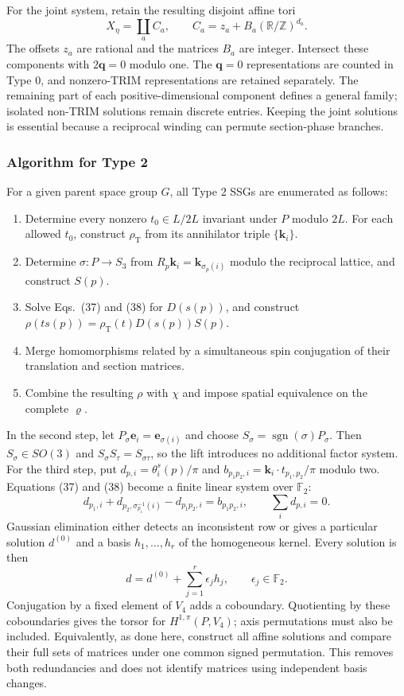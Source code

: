 \documentclass{article}
\begin{document}
For the joint system, retain the resulting disjoint affine tori
\[
 X_\eta=\coprod_a C_a,\qquad
 C_a=z_a+B_a(\mathbb R/\mathbb Z)^{d_a}.
\]
The offsets $z_a$ are rational and the matrices $B_a$ are integer.
Intersect these components with $2\bm q=0$ modulo one. The
$\bm q=0$ representations are counted in Type 0, and nonzero-TRIM
representations are retained separately. The remaining part of each
positive-dimensional component defines a general family; isolated
non-TRIM solutions remain discrete entries. Keeping the joint
solutions is essential because a reciprocal winding can permute
section-phase branches.

\subsubsection{Algorithm for Type 2}

For a given parent space group $G$, all Type 2 SSGs are enumerated
as follows:
\begin{enumerate}
\renewcommand{\labelenumi}{(\roman{enumi})}
\item Determine every nonzero $t_0\in L/2L$ invariant under $P$
modulo $2L$. For each allowed $t_0$, construct $\rho_{\mathrm T}$
from its annihilator triple $\{\bm k_i\}$.
\item Determine $\sigma:P\to S_3$ from
$R_p\bm k_i=\bm k_{\sigma_p(i)}$ modulo the reciprocal lattice,
and construct $S(p)$.
\item Solve Eqs.~(37) and (38) for $D(s(p))$, and construct
$\rho(t s(p))=\rho_{\mathrm T}(t)D(s(p))S(p)$.
\item Merge homomorphisms related by a simultaneous spin
conjugation of their translation and section matrices.
\item Combine the resulting $\rho$ with $\chi$ and impose spatial
equivalence on the complete $\varrho$.
\end{enumerate}

In the second step, let $P_\sigma\bm e_i=\bm e_{\sigma(i)}$ and
choose $S_\sigma=\operatorname{sgn}(\sigma)P_\sigma$.
Then $S_\sigma\in SO(3)$ and $S_\sigma S_\tau=S_{\sigma\tau}$,
so the lift introduces no additional factor system.
For the third step, put
$d_{p,i}=\theta_i^s(p)/\pi$ and
$b_{p_1p_2,i}=\bm k_i\cdot t_{p_1,p_2}/\pi$ modulo two.
Equations (37) and (38) become a finite linear system over
$\mathbb F_2$:
\[
 d_{p_1,i}+d_{p_2,\sigma_{p_1}^{-1}(i)}-d_{p_1p_2,i}
       =b_{p_1p_2,i},\qquad
 \sum_i d_{p,i}=0.
\]
Gaussian elimination either detects an inconsistent row or gives a
particular solution $d^{(0)}$ and a basis $h_1,\ldots,h_r$ of the
homogeneous kernel. Every solution is then
\[
 d=d^{(0)}+\sum_{j=1}^r\epsilon_jh_j,
 \qquad \epsilon_j\in\mathbb F_2.
\]
Conjugation by a fixed element of $V_4$ adds a coboundary. Quotienting
by these coboundaries gives the torsor for $H^{1,\pi}(P,V_4)$;
axis permutations must also be included. Equivalently, as done here,
construct all affine solutions and compare their full sets of matrices
under one common signed permutation. This removes both redundancies
and does not identify matrices using independent basis changes.
\end{document}

